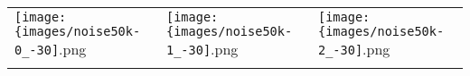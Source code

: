  \begin{tabular}{lll}
\texttt{[image: \{images/noise50k-0\_-30]}.png} &\texttt{[image: \{images/noise50k-1\_-30]}.png} &\texttt{[image: \{images/noise50k-2\_-30]}.png} 
 \\ \hfill\end{tabular}